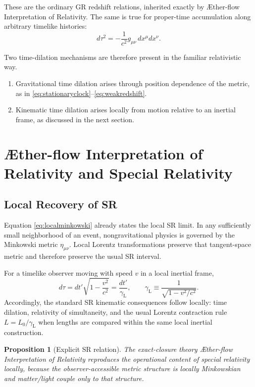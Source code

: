 \documentclass[11pt]{article}
\newcommand{\Aflow}{\AE{}ther-flow}
\newcommand{\TheoryName}{\Aflow{} Interpretation of Relativity}
\newcommand{\Lor}{\gamma_{\mathrm{L}}}
\newtheorem{proposition}{Proposition}
\begin{document}
These are the ordinary GR redshift relations, inherited exactly by \TheoryName{}. The same is true for proper-time accumulation along arbitrary timelike histories:
\begin{equation}
d\tau^2
=
-\frac{1}{c^2}g_{\mu\nu}\,dx^\mu dx^\nu.
\label{eq:propertime}
\end{equation}

Two time-dilation mechanisms are therefore present in the familiar relativistic way.
\begin{enumerate}
    \item Gravitational time dilation arises through position dependence of the metric, as in \eqref{eq:stationaryclock}--\eqref{eq:weakredshift}.
    \item Kinematic time dilation arises locally from motion relative to an inertial frame, as discussed in the next section.
\end{enumerate}

\section{\TheoryName{} and Special Relativity}

\subsection{Local Recovery of SR}

Equation \eqref{eq:localminkowski} already states the local SR limit. In any sufficiently small neighborhood of an event, nongravitational physics is governed by the Minkowski metric \(\eta_{\mu\nu}\). Local Lorentz transformations preserve that tangent-space metric and therefore preserve the usual SR interval.

For a timelike observer moving with speed \(v\) in a local inertial frame,
\begin{equation}
d\tau
=
dt'\sqrt{1-\frac{v^2}{c^2}}
=
\frac{dt'}{\Lor},
\qquad
\Lor\equiv \frac{1}{\sqrt{1-v^2/c^2}}.
\label{eq:kinematictimedilation}
\end{equation}
Accordingly, the standard SR kinematic consequences follow locally: time dilation, relativity of simultaneity, and the usual Lorentz contraction rule \(L=L_0/\Lor\) when lengths are compared within the same local inertial construction.

\begin{proposition}[Explicit SR relation]
The exact-closure theory \TheoryName{} reproduces the operational content of special relativity locally, because the observer-accessible metric structure is locally Minkowskian and matter/light couple only to that structure.
\end{proposition}
\end{document}
